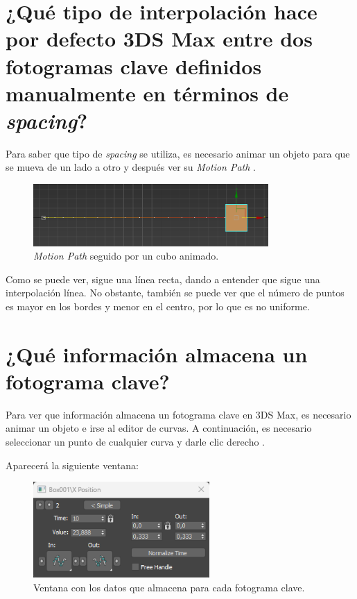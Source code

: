 \documentclass{article}
\begin{document}
\section{¿Qué tipo de interpolación hace por defecto 3DS Max entre dos fotogramas clave definidos manualmente en términos de \textit{spacing}?}

Para saber que tipo de \textit{spacing} se utiliza, es necesario animar un objeto para que se mueva de un lado a otro y después ver su \textit{Motion Path} \cite{explicacion}.

\begin{figure}[H]
    \centering
    \includegraphics[width=0.8\textwidth]{imagenes/3-1.png}
    \caption{\textit{Motion Path} seguido por un cubo animado.}
\end{figure}

Como se puede ver, sigue una línea recta, dando a entender que sigue una interpolación línea. No obstante, también se puede ver que el número de puntos es mayor en los bordes y menor en el centro, por lo que es no uniforme. 



\newpage
\section{¿Qué información almacena un fotograma clave?}

Para ver que información almacena un fotograma clave en 3DS Max, es necesario animar un objeto e irse al editor de curvas. A continuación, es necesario seleccionar un punto de cualquier curva y darle clic derecho \cite{explicacion}.

\bigskip

Aparecerá la siguiente ventana:

\begin{figure}[H]
    \centering
    \includegraphics[width=0.6\textwidth]{imagenes/4-1.png}
    \caption{Ventana con los datos que almacena para cada fotograma clave.}
\end{figure}
\end{document}
